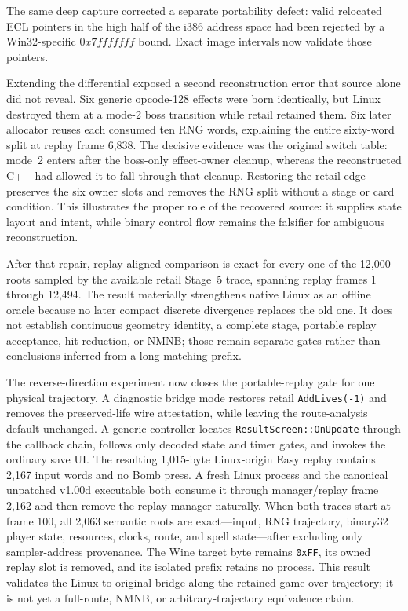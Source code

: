 \documentclass[10pt]{article}
\newcommand{\code}[1]{\texttt{#1}}
\begin{document}
The same deep capture corrected a separate portability defect: valid relocated
ECL pointers in the high half of the i386 address space had been rejected by a
Win32-specific $0x7fffffff$ bound.  Exact image intervals now validate those
pointers.

Extending the differential exposed a second reconstruction error that source
alone did not reveal.  Six generic opcode-128 effects were born identically,
but Linux destroyed them at a mode-2 boss transition while retail retained
them.  Six later allocator reuses each consumed ten RNG words, explaining the
entire sixty-word split at replay frame 6,838.  The decisive evidence was the
original switch table: mode~2 enters after the boss-only effect-owner cleanup,
whereas the reconstructed C++ had allowed it to fall through that cleanup.
Restoring the retail edge preserves the six owner slots and removes the RNG
split without a stage or card condition.  This illustrates the proper role of
the recovered source: it supplies state layout and intent, while binary
control flow remains the falsifier for ambiguous reconstruction.

After that repair, replay-aligned comparison is exact for every one of the
12,000 roots sampled by the available retail Stage~5 trace, spanning replay
frames 1 through 12,494.  The result materially strengthens native Linux as an
offline oracle because no later compact discrete divergence replaces the old
one.  It does not establish continuous geometry identity, a complete stage,
portable replay acceptance, hit reduction, or NMNB; those remain separate
gates rather than conclusions inferred from a long matching prefix.

The reverse-direction experiment now closes the portable-replay gate for one
physical trajectory.  A diagnostic bridge mode restores retail
\code{AddLives(-1)} and removes the preserved-life wire attestation, while
leaving the route-analysis default unchanged.  A generic controller locates
\code{ResultScreen::OnUpdate} through the callback chain, follows only decoded
state and timer gates, and invokes the ordinary save UI.  The resulting
1,015-byte Linux-origin Easy replay contains 2,167 input words and no Bomb
press.  A fresh Linux process and the canonical unpatched v1.00d executable
both consume it through manager/replay frame 2,162 and then remove the replay
manager naturally.  When both traces start at frame 100, all 2,063 semantic
roots are exact---input, RNG trajectory, binary32 player state, resources,
clocks, route, and spell state---after excluding only sampler-address
provenance.  The Wine target byte remains \code{0xFF}, its owned replay slot is
removed, and its isolated prefix retains no process.  This result validates
the Linux-to-original bridge along the retained game-over trajectory; it is
not yet a full-route, NMNB, or arbitrary-trajectory equivalence claim.
\end{document}
